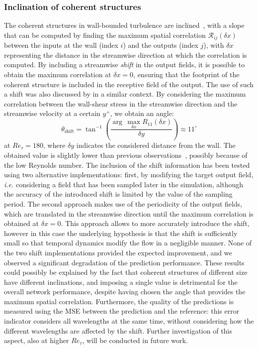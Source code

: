 \subsubsection{Inclination of coherent structures} \label{sss:shift}
The coherent structures in wall-bounded turbulence are inclined~\citep{marusic2007reynolds}, with a slope that can be computed by finding the maximum spatial correlation $\mathcal{R}_{ij}(\delta x)$ between the inputs at the wall (index $i$) and the outputs (index $j$), with $\delta x$ representing the distance in the streamwise direction at which the correlation is computed.
By including a streamwise \textit{shift} in the output fields, it is possible to obtain the maximum correlation at $\delta x=0$, ensuring that the footprint of the coherent structure is included in the receptive field of the output.
The use of such a shift was also discussed by \citet{sasaki2019transfer} in a similar context.
By considering the maximum correlation between the wall-shear stress in the streamwise direction and the streamwise velocity at a certain $y^+$, we obtain an angle:
\begin{equation}
 \theta_{\mathrm{shift}} = \tan^{-1}\left(\frac{\arg\,\max_{\delta x} R_{11}(\delta x)}{\delta y}\right) \approx 11^{\circ}
\end{equation}
\noindent at $Re_{\tau}=180$, where $\delta y$ indicates the considered distance from the wall.
 The obtained value is slightly lower than previous observations~\citep{marusic2007reynolds,sasaki2019transfer}, possibly because of the low Reynolds number.
 The inclusion of the shift information has been tested using two alternative implementations: first, by modifying the target output field, {\it i.e.} considering a field that has been sampled later in the simulation, although the accuracy of the introduced shift is limited by the value of the sampling period.
 The second approach makes use of the periodicity of the output fields, which are translated in the streamwise direction until the maximum correlation is obtained at $\delta x=0$.
 This approach allows to more accurately introduce the shift, however in this case the underlying hypothesis is that the shift is sufficiently small so that temporal dynamics modify the flow in a negligible manner.
 None of the two shift implementations provided the expected improvement, and we observed a significant degradation of the prediction performance.
 These results could possibly be explained by the fact that coherent structures of different size have different inclinations, and imposing a single value is detrimental for the overall network performance, despite having chosen the angle that provides the maximum spatial correlation.
 Furthermore, the quality of the predictions is measured using the MSE between the prediction and the reference: this error indicator considers all wavelengths at the same time, without considering how the different wavelengths are affected by the shift.
 Further investigation of this aspect, also at higher $Re_{\tau}$, will be conducted in future work.

